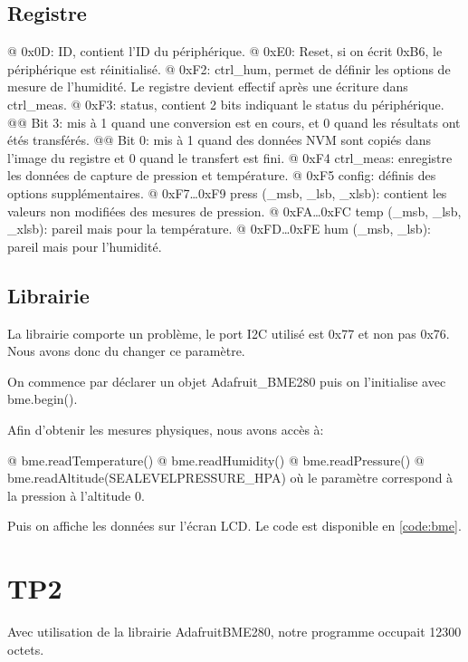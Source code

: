 \documentclass{report}
\begin{document}
  		\section{Registre}
  			\begin{easylist}[itemize]
  				@ 0x0D: ID, contient l'ID du périphérique.
  				@ 0xE0: Reset, si on écrit 0xB6, le périphérique est réinitialisé.
  				@ 0xF2: ctrl\_hum, permet de définir les options de mesure de l'humidité. Le registre devient effectif après une écriture dans ctrl\_meas.
  				@ 0xF3: status, contient 2 bits indiquant le status du périphérique.
  				@@ Bit 3: mis à 1 quand une conversion est en cours, et 0 quand les résultats ont étés transférés.
  				@@ Bit 0: mis à 1 quand des données NVM sont copiés dans l'image du registre et 0 quand le transfert est fini.
  				@ 0xF4 ctrl\_meas: enregistre les données de capture de pression et température.
  				@ 0xF5 config: définis des options supplémentaires.
  				@ 0xF7…0xF9 press (\_msb, \_lsb, \_xlsb): contient les valeurs non modifiées des mesures de pression.
  				@ 0xFA…0xFC temp (\_msb, \_lsb, \_xlsb): pareil mais pour la température.
  				@ 0xFD…0xFE hum (\_msb, \_lsb): pareil mais pour l'humidité.
  				\end{easylist}
  			
  		\section{Librairie}
  			La librairie comporte un problème, le port I2C utilisé est 0x77 et non pas 0x76.
  			Nous avons donc du changer ce paramètre.
  			
  			On commence par déclarer un objet Adafruit\_BME280 puis on l'initialise avec bme.begin().
  			
  			Afin d'obtenir les mesures physiques, nous avons accès à:
  			\begin{easylist}[itemize]
  				@ bme.readTemperature()
  				@ bme.readHumidity()
  				@ bme.readPressure()
  				@ bme.readAltitude(SEALEVELPRESSURE\_HPA) où le paramètre correspond à la pression à l'altitude 0.
  			\end{easylist}
  			
  			Puis on affiche les données sur l'écran LCD.
  			Le code est disponible en \autoref{code:bme}.
  			
  	\chapter{TP2}
  		Avec utilisation de la librairie AdafruitBME280, notre programme occupait 12300 octets.
  		
\end{document}
